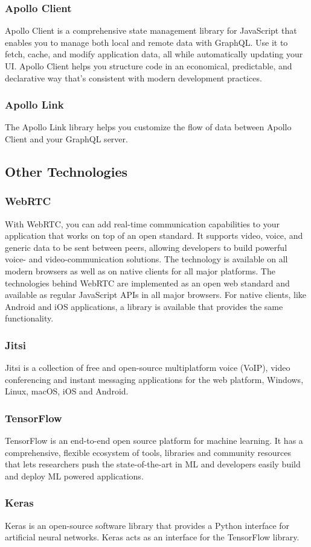     \subsubsection{Apollo Client}
    Apollo Client is a comprehensive state management library for JavaScript that enables you to manage both local and remote data with GraphQL.
    Use it to fetch, cache, and modify application data, all while automatically updating your UI.
    Apollo Client helps you structure code in an economical, predictable, and declarative way that's consistent with modern development practices. 

    \subsubsection{Apollo Link}
    The Apollo Link library helps you customize the flow of data between Apollo Client and your GraphQL server.

\subsection{Other Technologies}

    \subsubsection{WebRTC}
    With WebRTC, you can add real-time communication capabilities to your application that works on top of an open standard. 
    It supports video, voice, and generic data to be sent between peers, allowing developers to build powerful 
    voice- and video-communication solutions. The technology is available on all modern browsers as well as on native clients 
    for all major platforms. The technologies behind WebRTC are implemented as an open web standard and available as regular JavaScript APIs 
    in all major browsers. For native clients, like Android and iOS applications, a library is available that provides the same functionality.

    \subsubsection{Jitsi}
    Jitsi is a collection of free and open-source multiplatform voice (VoIP), video conferencing and instant messaging applications for the web platform, 
    Windows, Linux, macOS, iOS and Android.

    \subsubsection{TensorFlow}
    TensorFlow is an end-to-end open source platform for machine learning. It has a comprehensive, flexible ecosystem of tools, 
    libraries and community resources that lets researchers push the state-of-the-art in ML and developers easily build and deploy ML powered applications.

    \subsubsection{Keras}
    Keras is an open-source software library that provides a Python interface for artificial neural networks. Keras acts as an interface for the TensorFlow library. 
